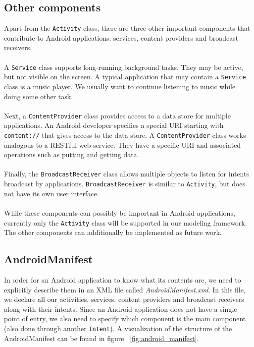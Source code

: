 \subsection{Other components}

Apart from the \texttt{Activity} class, there are three other important components that contribute to Android applications: services, content providers and broadcast receivers. 
\\ \\
A \texttt{Service} class supports long-running background tasks. They may be active, but not visible on the screen. A typical application that may contain a \texttt{Service} class is a music player. We usually want to continue listening to music while doing some other task.
\\ \\
Next, a \texttt{ContentProvider} class provides access to a data store for multiple applications. An Android developer specifies a special URI starting with \texttt{content://} that gives access to the data store. A \texttt{ContentProvider} class works analogous to a RESTful web service. They have a specific URI and associated operations such as putting and getting data.
\\ \\
Finally, the \texttt{BroadcastReceiver} class allows multiple objects to listen for intents broadcast by applications. \texttt{BroadcastReceiver} is similar to \texttt{Activity}, but does not have its own user interface. 
\\ \\
While these components can possibly be important in Android applications, currently only the \texttt{Activity} class will be supported in our modeling framework. The other components can additionally be implemented as future work.

\subsection{AndroidManifest}

In order for an Android application to know what its contents are, we need to explicitly describe them in an XML file called \textit{AndroidManifest.xml}. In this file, we declare all our activities, services, content providers and broadcast receivers along with their intents. Since an Android application does not have a single point of entry, we also need to specify which component is the main component (also done through another \texttt{Intent}). A visualization of the structure of the AndroidManifest can be found in figure ~\ref{fig:android_manifest}.

